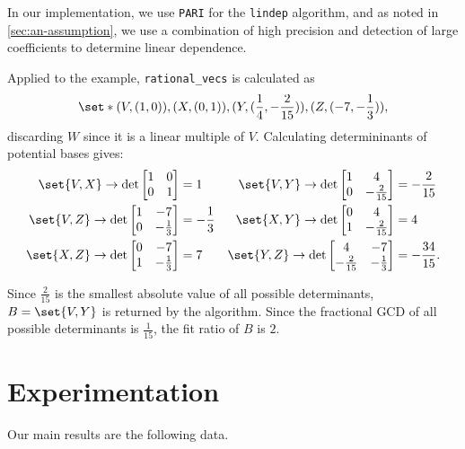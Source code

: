 \documentclass[10pt]{amsart}
\numberwithin{equation}{theorem}
\theoremstyle{definition}
\newcommand{\codebit}[1]{\texttt{#1}}
\newcommand{\prog}[1]{\texttt{#1}}
\begin{document}
In our implementation, we use \prog{PARI} for the \codebit{lindep}
algorithm, and as noted in \ref{sec:an-assumption}, we use a combination
of high precision and detection of large coefficients to determine
linear dependence.

Applied to the example, \codebit{rational\_vecs} is calculated as \[
\set*{(V, (1,0)), (X, (0,1)), (Y, (\frac{1}{4}, -\frac{2}{15})), (Z,
(-7, -\frac{1}{3}))}, \] discarding $W$ since it is a linear multiple
of $V$. Calculating determininants of potential bases gives:
\begin{align*}
  \set{V,X} \rightarrow \det \begin{bmatrix}1 & 0 \\ 0 & 1\end{bmatrix} &= 1 & \set{V,Y} \rightarrow \det \begin{bmatrix}1 & 4 \\ 0 & -\frac{2}{15}\end{bmatrix} &= -\frac{2}{15} \\
  \set{V,Z} \rightarrow \det \begin{bmatrix}1 & -7 \\ 0 & -\frac{1}{3}\end{bmatrix} &= -\frac{1}{3} & \set{X,Y} \rightarrow \det \begin{bmatrix}0 & 4 \\ 1 & -\frac{2}{15}\end{bmatrix} &= 4 \\
  \set{X,Z} \rightarrow \det \begin{bmatrix}0 & -7 \\ 1 & -\frac{1}{3}\end{bmatrix} &= 7 & \set{Y,Z} \rightarrow \det \begin{bmatrix}4 & -7 \\ -\frac{2}{15} & -\frac{1}{3}\end{bmatrix} &= -\frac{34}{15}.
\end{align*}
        
Since $\frac{2}{15}$ is the smallest absolute value of all possible
determinants, $B = \set{V, Y}$ is returned by the algorithm. Since the
fractional GCD of all possible determinants is $\frac{1}{15}$, the fit
ratio of $B$ is $2$.

\section{Experimentation}
\label{sec:main-result}

Our main results are the following data.
\end{document}
